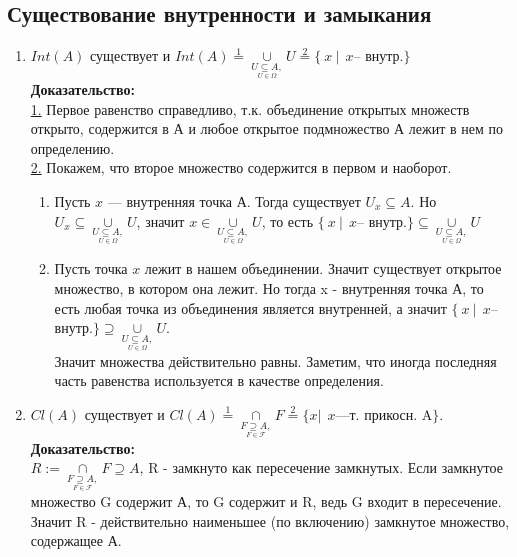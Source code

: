 \documentclass{article}
\begin{document}
\begin{spacing}{1.5}
\subsection{Существование внутренности и замыкания}
\begin{enumerate}
\item $Int(A)$ существует и $Int(A)\overset{1}{=}\underset{\underset{U\in\Omega}{U\subseteq A,}}{\cup}U\overset{2}{=}\lbrace ~x~ |~~x$-- внутр.$\rbrace$
\\
\textbf{Доказательство:}
\\ \underline{1.} Первое равенство справедливо, т.к. объединение открытых множеств открыто, содержится в А и любое открытое подмножество А лежит в нем по определению.
\\ \underline{2.} Покажем, что второе множество содержится в первом и наоборот.
\begin{enumerate}
\item Пусть $x$ --- внутренняя точка А. Тогда существует $U_{x}\subseteq A$. Но $U_{x}\subseteq \underset{\underset{U\in\Omega}{U\subseteq A,}}{\cup}U$, значит $x\in \underset{\underset{U\in\Omega}{U\subseteq A,}}{\cup}U$, то есть $\lbrace ~x~ |~~x$-- внутр.$\rbrace\subseteq \underset{\underset{U\in\Omega}{U\subseteq A,}}{\cup}U$
\item Пусть точка $x$ лежит в нашем объединении. Значит существует открытое множество, в котором она лежит. Но тогда x - внутренняя точка А, то есть любая точка из объединения является внутренней, а значит $\lbrace ~x~ |~~x$-- внутр.$\rbrace\supseteq \underset{\underset{U\in\Omega}{U\subseteq A,}}{\cup}U$.
\\Значит множества действительно равны. Заметим, что иногда последняя часть равенства используется в качестве определения.
\end{enumerate}
\item $Cl(A)$ существует и $Cl(A)\overset{1}{=}\underset{\underset{F\in\mathcal{F}}{ F\supseteq A,}}{\cap}F\overset{2}{=}\lbrace x|~~x$---т. прикосн. A$\rbrace$.
\\ \textbf{Доказательство:}
\\$R:=\underset{\underset{F\in\mathcal{F}}{ F\supseteq A,}}{\cap}F\supseteq A$, R - замкнуто как пересечение замкнутых. Если замкнутое множество G содержит А, то G содержит и R, ведь G входит в пересечение. Значит R - действительно наименьшее (по включению) замкнутое множество, содержащее А.
\end{enumerate}

\end{spacing}
\end{document}
